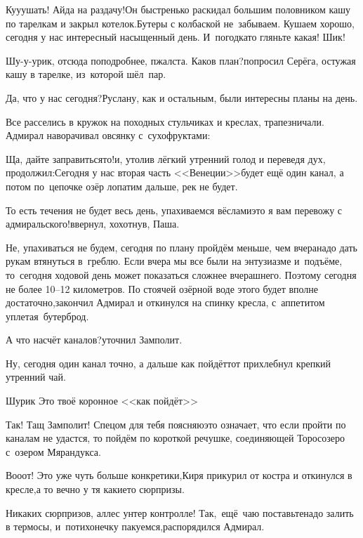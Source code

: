 \diagdash Ку\sdash у\sdash ушать! Айда на раздачу!\mdash Он быстренько раскидал большим половником кашу по тарелкам и закрыл котелок.\mdash Бутеры с колбаской не~забываем. Кушаем хорошо, сегодня у нас интересный насыщенный день. И~погодка\sdash то гляньте какая! Шик!

\diagdash Шу-у-урик, отсюда поподробнее, п\sdash жалста. Каков план?\mdash попросил Серёга, остужая кашу в тарелке, из~которой шёл~пар.

\diagdash Да, что у нас сегодня?\mdash Руслану, как и остальным, были интересны планы на день.

Все расселись в кружок на походных стульчиках и креслах, трапезничали. Адмирал наворачивал овсянку с~сухофруктами:

\diagdash Ща, дайте заправиться\sdash то!\mdash и, утолив лёгкий утренний голод и переведя дух, продолжил:\mdash Сегодня у нас вторая часть <<Венеции>>\mdash будет ещё один канал, а потом по~цепочке озёр лопатим дальше, рек не будет.

\diagdash То есть течения не будет весь день, упахиваемся вёслами\mdash это я вам перевожу с адмиральского!\mdash ввернул, хохотнув, Паша.

\diagdash Не, упахиваться не будем, сегодня по плану пройдём меньше, чем вчера\mdash надо дать рукам втянуться в~греблю. Если вчера мы все были на энтузиазме и~подъёме, то~сегодня ходовой день может показаться сложнее вчерашнего. Поэтому сегодня не более 10\nobreakdash--12 километров. По стоячей озёрной воде этого будет вполне достаточно,\mdash закончил Адмирал и откинулся на спинку кресла, с~аппетитом уплетая~бутерброд.%

\diagdash А что насчёт каналов?\mdash уточнил Замполит.

\diagdash Ну, сегодня один канал точно, а дальше как пойдёт\myldots{}\mdash тот прихлебнул крепкий утренний чай.

\diagdash Шурик\myldots{} Это твоё коронное <<как пойдёт>>\myldots{}

\diagdash Так! Тащ Замполит! Спецом для тебя поясняю\mdash это означает, что если пройти по каналам не удастся, то пойдём по короткой речушке, соединяющей Торосозеро с~озером Мярандукса.

\diagdash Во\sdash о\sdash от! Это уже чуть больше конкретики,\mdash Киря прикурил от костра и откинулся в кресле,\mdash а то вечно у тя какие\sdash то сюрпризы.

\diagdash Никаких сюрпризов, аллес унтер контролле! Так,~ещё~чаю поставьте\mdash надо залить в термосы, и~потихонечку пакуемся,\mdash распорядился Адмирал.

